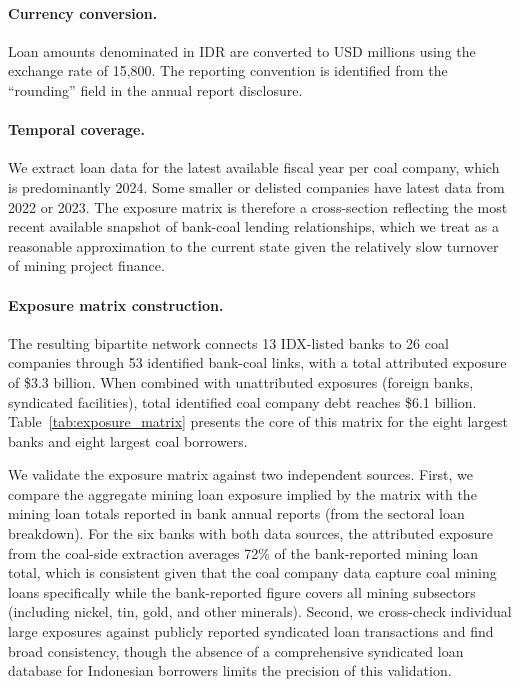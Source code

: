 \paragraph{Currency conversion.} Loan amounts denominated in IDR are converted to USD millions using the exchange rate of 15{,}800. The reporting convention is identified from the ``rounding'' field in the annual report disclosure.

\paragraph{Temporal coverage.} We extract loan data for the latest available fiscal year per coal company, which is predominantly 2024. Some smaller or delisted companies have latest data from 2022 or 2023. The exposure matrix is therefore a cross-section reflecting the most recent available snapshot of bank-coal lending relationships, which we treat as a reasonable approximation to the current state given the relatively slow turnover of mining project finance.

\paragraph{Exposure matrix construction.} The resulting bipartite network connects 13 IDX-listed banks to 26 coal companies through 53 identified bank-coal links, with a total attributed exposure of \$3.3 billion. When combined with unattributed exposures (foreign banks, syndicated facilities), total identified coal company debt reaches \$6.1 billion. Table~\ref{tab:exposure_matrix} presents the core of this matrix for the eight largest banks and eight largest coal borrowers.



 We validate the exposure matrix against two independent sources. First, we compare the aggregate mining loan exposure implied by the matrix with the mining loan totals reported in bank annual reports (from the sectoral loan breakdown). For the six banks with both data sources, the attributed exposure from the coal-side extraction averages 72\% of the bank-reported mining loan total, which is consistent given that the coal company data capture coal mining loans specifically while the bank-reported figure covers all mining subsectors (including nickel, tin, gold, and other minerals). Second, we cross-check individual large exposures against publicly reported syndicated loan transactions and find broad consistency, though the absence of a comprehensive syndicated loan database for Indonesian borrowers limits the precision of this validation.



